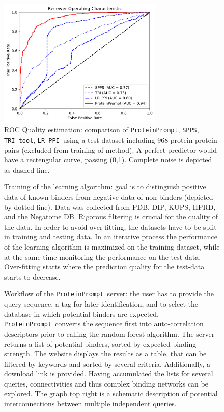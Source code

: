 \documentclass{article}
\newcommand{\spps}{\texttt{SPPS}}
\newcommand{\tri}{\texttt{TRI\_tool}}
\newcommand{\lr}{\texttt{LR\_PPI}}
\newcommand{\tool}{\texttt{ProteinPrompt}}
\begin{document}
\begin{figure}
  \centerline{\includegraphics[width=0.7\textwidth]{img/comparison_roc.pdf}}
  \caption{ROC Quality estimation: comparison of \tool, \spps, \tri, \lr\ using a test-dataset including 968 protein-protein pairs (excluded from training of method). A perfect predictor would have a rectengular curve, passing (0,1). Complete noise is depicted as dashed line.}
  \label{fig:comparison}
\end{figure}


\begin{figure}
  
  \caption{ Training of the learning algorithm: goal is to distinguish positive data of known binders from negative data of non-binders (depicted by dotted line). Data was collected from PDB, DIP, KUPS, HPRD, and the Negatome DB. Rigorous filtering is crucial for the quality of the data. In order to avoid over-fitting, the datasets have to be split in training and testing data. In an iterative process the performance of the learning algorithm is maximized on the training dataset, while at the same time monitoring the performance on the test-data. Over-fitting starts where the prediction quality for the test-data starts to decrease.}
  \label{fig:training}
\end{figure}


\begin{figure}
  
  \caption{ Workflow of the \tool\  server: the user has to provide the query sequence, a tag for later identification, and to select the database in which potential binders are expected. \tool\  converts the sequence first into auto-correlation descriptors prior to calling the random forest algorithm.
    The server returns a list of potential binders, sorted by expected binding strength.
     The website displays the results as a table, that can be filtered by keywords and sorted by several criteria. 
    Additionally, a download link is provided. Having accumulated the lists for several queries, connectivities and thus complex binding networks can be explored.
    The graph top right is a schematic description of potential interconnections between multiple independent queries.}
  \label{fig:workflow}
\end{figure}
\end{document}
